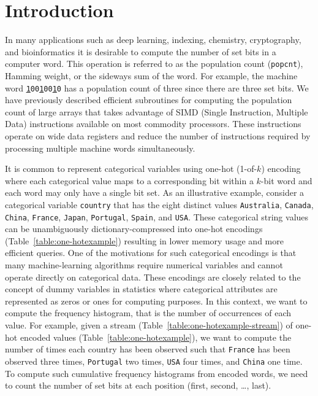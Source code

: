 \documentclass[AMA,STIX1COL]{WileyNJD-v2}
\begin{document}
\section{Introduction}\thispagestyle{empty}

In many applications such as deep learning\cite{Dai2017,Courbariaux2016,Zhang2018,Hubara2016}, indexing\cite{Lemire2016}, chemistry\cite{Haque2011}, 
cryptography\cite{Sanyal2018}, and bioinformatics\cite{Layer2016,Danek2018,Wu2010,Purcell2007} it is desirable to compute the number of set bits in a computer word. 
This operation is referred to as the population count (\texttt{popcnt}), Hamming weight, or the sideways sum of the word. 
For example, the machine word \texttt{\underline{1}00\underline{1}00\underline{1}0} has a population count of three since there are three set bits. We have previously described efficient subroutines for computing the population count\cite{mula2017faster} of large arrays that
takes advantage of SIMD (Single Instruction, Multiple Data) instructions available on most commodity
processors. These instructions operate on wide data registers and reduce the number of instructions required by processing multiple machine words simultaneously.

It is common to represent categorical variables using one-hot (1-of-$k$) encoding\cite{lippert2013exhaustive,mittag2015influence} where each categorical value maps to a corresponding bit within a $k$-bit word and each word may only have a single bit set.
As an illustrative example, consider a categorical variable \texttt{country} that has the eight distinct values \texttt{Australia}, \texttt{Canada}, \texttt{China}, \texttt{France}, \texttt{Japan}, \texttt{Portugal}, \texttt{Spain}, and \texttt{USA}. These categorical string values can be unambiguously dictionary-compressed into one-hot encodings (Table~\ref{table:one-hotexample}) resulting in lower memory usage and more efficient queries. One of the motivations for such categorical encodings is that many machine-learning algorithms require numerical variables and cannot operate directly on categorical data. These encodings are closely related to the concept of dummy variables in statistics where categorical attributes are represented as zeros or ones for computing purposes. In this context, we want to compute the frequency histogram, that is the number of occurrences of each value. For example, given a stream (Table~\ref{table:one-hotexample-stream}) of one-hot encoded values (Table~\ref{table:one-hotexample}), we want to compute the number of times each country has been observed such that \texttt{France} has been observed three times, \texttt{Portugal} two times, \texttt{USA} four times, and \texttt{China} one time.
To compute such cumulative frequency histograms from encoded words, we need to count the number of set bits at each position (first, second, \ldots, last).
\end{document}
